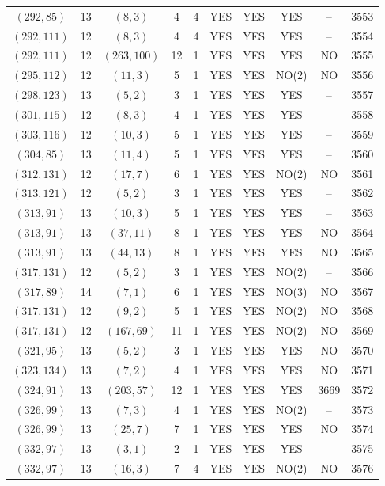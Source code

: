 \begin{longtable}{|c|c|c|c|c|c|c|c|c|c|}
$(292, 85)$ & 13 & $(8, 3)$ & 4 & 4 & YES & YES & YES & -- & 3553\\
$(292, 111)$ & 12 & $(8, 3)$ & 4 & 4 & YES & YES & YES & -- & 3554\\
$(292, 111)$ & 12 & $(263, 100)$ & 12 & 1 & YES & YES & YES & NO & 3555\\
$(295, 112)$ & 12 & $(11, 3)$ & 5 & 1 & YES & YES & NO(2) & NO & 3556\\
$(298, 123)$ & 13 & $(5, 2)$ & 3 & 1 & YES & YES & YES & -- & 3557\\
$(301, 115)$ & 12 & $(8, 3)$ & 4 & 1 & YES & YES & YES & -- & 3558\\
$(303, 116)$ & 12 & $(10, 3)$ & 5 & 1 & YES & YES & YES & -- & 3559\\
$(304, 85)$ & 13 & $(11, 4)$ & 5 & 1 & YES & YES & YES & -- & 3560\\
$(312, 131)$ & 12 & $(17, 7)$ & 6 & 1 & YES & YES & NO(2) & NO & 3561\\
$(313, 121)$ & 12 & $(5, 2)$ & 3 & 1 & YES & YES & YES & -- & 3562\\
$(313, 91)$ & 13 & $(10, 3)$ & 5 & 1 & YES & YES & YES & -- & 3563\\
$(313, 91)$ & 13 & $(37, 11)$ & 8 & 1 & YES & YES & YES & NO & 3564\\
$(313, 91)$ & 13 & $(44, 13)$ & 8 & 1 & YES & YES & YES & NO & 3565\\
$(317, 131)$ & 12 & $(5, 2)$ & 3 & 1 & YES & YES & NO(2) & -- & 3566\\
$(317, 89)$ & 14 & $(7, 1)$ & 6 & 1 & YES & YES & NO(3) & NO & 3567\\
$(317, 131)$ & 12 & $(9, 2)$ & 5 & 1 & YES & YES & NO(2) & NO & 3568\\
$(317, 131)$ & 12 & $(167, 69)$ & 11 & 1 & YES & YES & NO(2) & NO & 3569\\
$(321, 95)$ & 13 & $(5, 2)$ & 3 & 1 & YES & YES & YES & NO & 3570\\
$(323, 134)$ & 13 & $(7, 2)$ & 4 & 1 & YES & YES & YES & NO & 3571\\
$(324, 91)$ & 13 & $(203, 57)$ & 12 & 1 & YES & YES & YES & 3669 & 3572\\
$(326, 99)$ & 13 & $(7, 3)$ & 4 & 1 & YES & YES & NO(2) & -- & 3573\\
$(326, 99)$ & 13 & $(25, 7)$ & 7 & 1 & YES & YES & YES & NO & 3574\\
$(332, 97)$ & 13 & $(3, 1)$ & 2 & 1 & YES & YES & YES & -- & 3575\\
$(332, 97)$ & 13 & $(16, 3)$ & 7 & 4 & YES & YES & NO(2) & NO & 3576\\

\end{longtable}
